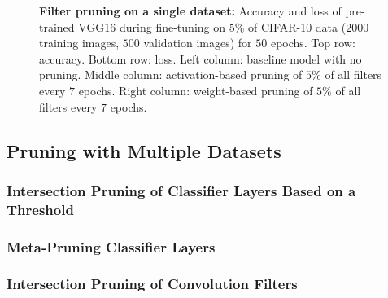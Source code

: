 \documentclass{article}
\begin{document}
\begin{figure}[!t]
{	}
	\caption{\textbf{Filter pruning on a single dataset:} Accuracy and loss of pre-trained VGG16 during fine-tuning on $5$\% of CIFAR-10 data ($2000$ training images, $500$ validation images) for $50$ epochs. Top row: accuracy. Bottom row: loss. Left column: baseline model with no pruning. Middle column: activation-based pruning of $5$\% of all filters every $7$ epochs. Right column: weight-based pruning of $5$\% of all filters every $7$ epochs.}
	\label{pruneFiltersSingle}
\end{figure}


%	
%	
%	

\subsection{Pruning with Multiple Datasets}

\subsubsection{Intersection Pruning of Classifier Layers Based on a Threshold}


\subsubsection{Meta-Pruning Classifier Layers}


\subsubsection{Intersection Pruning of Convolution Filters}
\end{document}
